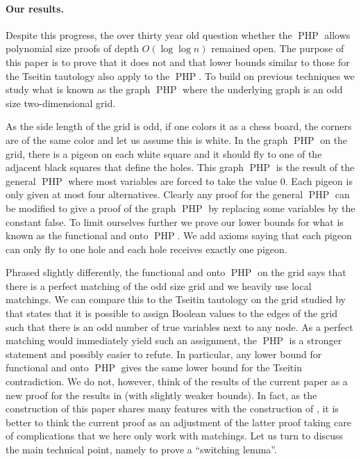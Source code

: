 \documentclass{theoretics}
\DeclareMathOperator{\PHP}{PHP}
\begin{document}
\paragraph{Our results.}
Despite this progress, the over thirty year old question whether the
$\PHP$ allows polynomial size proofs of depth $O( \log \log n)$
remained open.  The purpose of this paper is to prove
that it does not and that lower bounds similar to
those for the Tseitin tautology also apply to the
$\PHP$.   To build on previous techniques we study what is known as the
graph $\PHP$ where the underlying graph is an odd size
two-dimensional grid.  

As the side length of the grid is odd, if one colors it
as a chess board,  the corners are of the same color and
let us assume this is white.
In the graph $\PHP$ on
the grid, there is a pigeon on each white square and
it should fly to one of the adjacent black squares
that define the holes.   This graph $\PHP$ is the result
of the general $\PHP$ where most variables are forced to 
take the value $0$.
Each pigeon is only given at most four alternatives.
Clearly any proof for the general $\PHP$ can be modified
to give a proof of the graph $\PHP$ by replacing some variables
by the constant false.  To limit ourselves
further we prove our lower bounds for what is known
as the functional and onto $\PHP$.  We add axioms saying
that each pigeon can only fly to one hole and each hole
receives exactly one pigeon.

Phrased slightly differently, the functional and onto
$\PHP$ on the grid says that
there is a perfect matching of the odd size grid and we heavily use
local matchings.   We can compare this to
the Tseitin tautology on the grid studied
by \cite{jhtseitin, PRT21, jhkr} that states that it is possible to
assign Boolean values
to the edges of the grid such that there is an odd number
of true variables next to any node.  As a perfect matching
would immediately yield such an assignment, the $\PHP$ is a stronger
statement and possibly easier to refute.
In particular, any lower bound for functional and onto $\PHP$ gives
the same lower bound for the Tseitin contradiction.
We do not, however, think of the results of the current paper
as a new proof for the results in  \cite{jhkr} (with slightly weaker bounds).
In fact, as the construction
of this paper shares many features with the construction
of \cite{jhkr}, it is better to think the current proof
as an adjustment of the latter proof taking care of complications
that we here only work with matchings.
Let us turn to discuss the main technical point,
namely to prove a ``switching lemma''.
\end{document}
